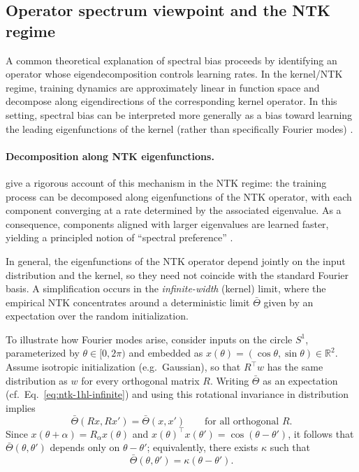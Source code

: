 \subsection{Operator spectrum viewpoint and the NTK regime}

A common theoretical explanation of spectral bias proceeds by identifying an
operator whose eigendecomposition controls learning rates. In the kernel/NTK
regime, training dynamics are approximately linear in function space and
decompose along eigendirections of the corresponding kernel operator. In this
setting, spectral bias can be interpreted more generally as a bias toward
learning the leading eigenfunctions of the kernel (rather than specifically
Fourier modes) \citep{bowman2022spectralbiasoutsidetraining}.

\paragraph{Decomposition along NTK eigenfunctions.}
\citet{cao2020understandingspectralbiasdeep} give a rigorous account of this
mechanism in the NTK regime: the training process can be decomposed along
eigenfunctions of the NTK operator, with each component converging at a rate
determined by the associated eigenvalue. As a consequence, components aligned
with larger eigenvalues are learned faster, yielding a principled notion of
``spectral preference'' \citep{cao2020understandingspectralbiasdeep}.

In general, the eigenfunctions of the NTK operator depend jointly on
the input distribution and the kernel, so they need not coincide with the
standard Fourier basis. A simplification occurs in the \emph{infinite-width}
(kernel) limit, where the empirical NTK concentrates around a deterministic
limit $\bar\Theta$ given by an expectation over the random initialization.

To illustrate how Fourier modes arise, consider inputs on the circle $S^1$,
parameterized by $\theta\in[0,2\pi)$ and embedded as
$x(\theta)=(\cos\theta,\sin\theta)\in\mathbb R^2$. Assume isotropic
initialization (e.g.\ Gaussian), so that $R^\top w$ has the same distribution as $w$ for every
orthogonal matrix $R$. Writing $\bar\Theta$ as an expectation (cf.\
Eq.~\eqref{eq:ntk-1hl-infinite}) and using this rotational invariance in
distribution implies
\[
	\bar\Theta(Rx,Rx')=\bar\Theta(x,x') \qquad \text{for all orthogonal }R.
\]
Since $x(\theta+\alpha)=R_\alpha x(\theta)$ and
$x(\theta)^\top x(\theta')=\cos(\theta-\theta')$, it follows that
$\bar\Theta(\theta,\theta')$ depends only on $\theta-\theta'$; equivalently,
there exists $\kappa$ such that
\[
	\bar\Theta(\theta,\theta')=\kappa(\theta-\theta').
\]


